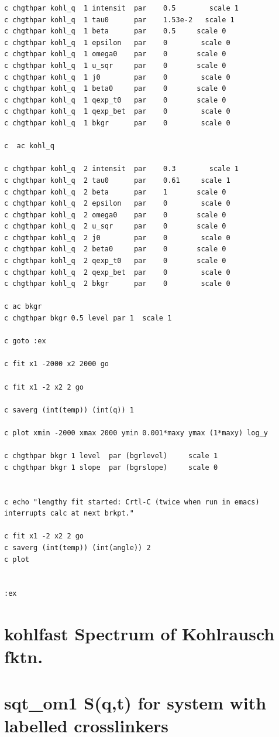 \documentclass[11pt,fleqn]{book} %
\newcommand{\desc}[1]{\hskip 0.5cm {\color{descgray} #1}}
\begin{document}
\begin{verbatim}
c chgthpar kohl_q  1 intensit  par    0.5        scale 1      
c chgthpar kohl_q  1 tau0      par    1.53e-2   scale 1
c chgthpar kohl_q  1 beta      par    0.5 	  scale 0
c chgthpar kohl_q  1 epsilon   par    0        scale 0
c chgthpar kohl_q  1 omega0    par    0 	  scale 0
c chgthpar kohl_q  1 u_sqr     par    0 	  scale 0
c chgthpar kohl_q  1 j0        par    0        scale 0
c chgthpar kohl_q  1 beta0     par    0 	  scale 0
c chgthpar kohl_q  1 qexp_t0   par    0 	  scale 0
c chgthpar kohl_q  1 qexp_bet  par    0        scale 0
c chgthpar kohl_q  1 bkgr      par    0        scale 0

c  ac kohl_q

c chgthpar kohl_q  2 intensit  par    0.3        scale 1      
c chgthpar kohl_q  2 tau0      par    0.61     scale 1
c chgthpar kohl_q  2 beta      par    1 	  scale 0
c chgthpar kohl_q  2 epsilon   par    0        scale 0
c chgthpar kohl_q  2 omega0    par    0 	  scale 0
c chgthpar kohl_q  2 u_sqr     par    0 	  scale 0
c chgthpar kohl_q  2 j0        par    0        scale 0
c chgthpar kohl_q  2 beta0     par    0 	  scale 0
c chgthpar kohl_q  2 qexp_t0   par    0 	  scale 0
c chgthpar kohl_q  2 qexp_bet  par    0        scale 0
c chgthpar kohl_q  2 bkgr      par    0        scale 0

c ac bkgr
c chgthpar bkgr 0.5 level par 1  scale 1

c goto :ex

c fit x1 -2000 x2 2000 go

c fit x1 -2 x2 2 go

c saverg (int(temp)) (int(q)) 1 

c plot xmin -2000 xmax 2000 ymin 0.001*maxy ymax (1*maxy) log_y

c chgthpar bkgr 1 level  par (bgrlevel)     scale 1
c chgthpar bkgr 1 slope  par (bgrslope)     scale 0


c echo "lengthy fit started: Crtl-C (twice when run in emacs) interrupts calc at next brkpt."

c fit x1 -2 x2 2 go
c saverg (int(temp)) (int(angle)) 2 
c plot


:ex
\end{verbatim}

\normalsize
\chapter{kohlfast \desc{Spectrum of Kohlrausch fktn. }}

\chapter{sqt\_om1 \desc{S(q,t) for system with labelled crosslinkers }}
\end{document}
